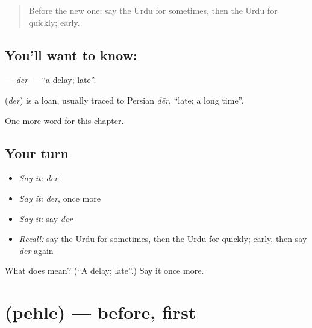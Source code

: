\label{lesson:UR-C77-der}



\begin{quote}
Before the new one: say the Urdu for sometimes, then the Urdu for quickly; early.
\end{quote}

\subsection*{You'll want to know: }
\textbf{} — \emph{der} — \textquotedblleft{}a delay; late\textquotedblright{}.

\begin{cousinweb}
\textbf{} (\emph{der}) is a loan, usually traced to Persian \emph{dēr}, \textquotedblleft{}late; a long time\textquotedblright{}.
\end{cousinweb}

\begin{grammarlens}[title={What you've built}]
One more word for this chapter.
\end{grammarlens}

\subsection*{Your turn}
\begin{itemize}
\raggedright
  \item \emph{Say it:} \emph{der}
  \item \emph{Say it:} \emph{der}, once more
  \item \emph{Say it:} say \emph{der}
  \item \emph{Recall:} say the Urdu for sometimes, then the Urdu for quickly; early, then say \emph{der} again
\end{itemize}

\begin{tcolorbox}[breakable,colback=teal!4,colframe=teal!35!black,title={Before you move on}]
What does  mean? (\textquotedblleft{}A delay; late\textquotedblright{}.) Say it once more.
\end{tcolorbox}
\section[\texorpdfstring{\ur{پہلے} (pehle)}{پہلے (pehle)}]{ (pehle) — before, first}

\label{lesson:UR-C77-pehle}



